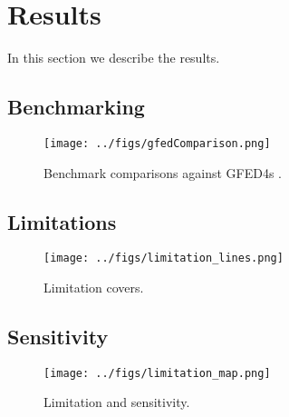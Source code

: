 \section{Results}\label{results}
In this section we describe the results.

\subsection{Benchmarking}

\begin{figure}[!ht]
  \centering
    \texttt{[image: ../figs/gfedComparison.png]}
  \caption{Benchmark comparisons against GFED4s \citep{Giglio2013}.}
\end{figure}

\subsection{Limitations}

\begin{figure}[!ht]
  \centering
    \texttt{[image: ../figs/limitation\_lines.png]}

  \caption{Limitation covers.}
\end{figure}


\subsection{Sensitivity}

\begin{figure}[!ht]
  \centering
    \texttt{[image: ../figs/limitation\_map.png]}

  \caption{Limitation and sensitivity.}
\end{figure}
